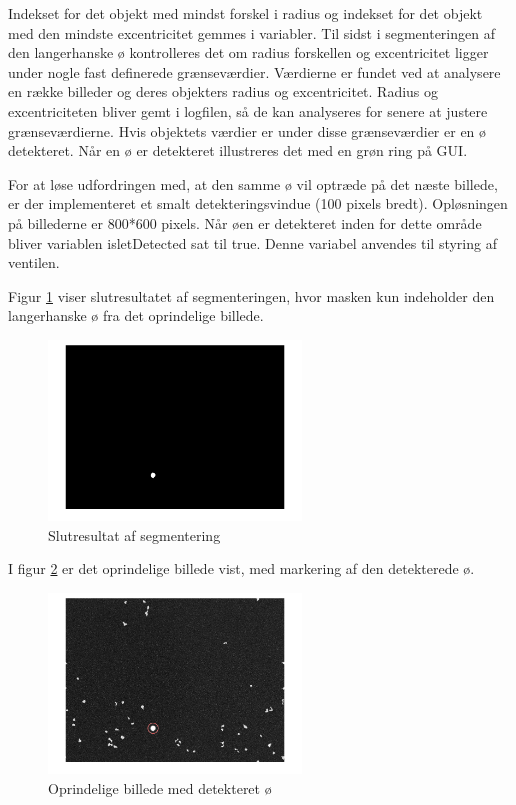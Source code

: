 Indekset for det objekt med mindst forskel i radius og indekset for det objekt med den mindste excentricitet gemmes i variabler. 
Til sidst i segmenteringen af den langerhanske ø kontrolleres det om radius forskellen og excentricitet ligger under nogle fast definerede grænseværdier. Værdierne er fundet ved at analysere en række billeder og deres objekters radius og excentricitet. Radius og excentriciteten bliver gemt i logfilen, så de kan analyseres for senere at justere grænseværdierne. Hvis objektets værdier er under disse grænseværdier er en ø detekteret. Når en ø er detekteret illustreres det med en grøn ring på GUI.

For at løse udfordringen med, at den samme ø vil optræde på det næste billede, er der implementeret et smalt detekteringsvindue (100 pixels bredt). Opløsningen på billederne er 800*600 pixels. Når øen er detekteret inden for dette område bliver variablen isletDetected sat til true. Denne variabel anvendes til styring af ventilen. 
 
Figur \ref{fig:segmented} viser slutresultatet af segmenteringen, hvor masken kun indeholder den langerhanske ø fra det oprindelige billede. 


\begin{figure}[H]
	\centering
	\includegraphics[width=0.6\textwidth]{billeder/software/segmented.png}
	\caption{Slutresultat af segmentering}
	\label{fig:segmented}
\end{figure}

I figur \ref{fig:finalimage} er det oprindelige billede vist, med markering af den detekterede ø.


\begin{figure}[H]
	\centering
	\includegraphics[width=0.6\textwidth]{billeder/software/finalimage.png}
	\caption{Oprindelige billede med detekteret ø}
	\label{fig:finalimage}
\end{figure}

